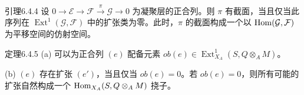\begin{origstatement}{引理}{6.4.4}\label{ch06:6.4.4}
设 $0\to\mathcal E\to\mathcal F\xrightarrow{\pi}\mathcal G\to0$ 为凝聚层的正合列。则 $\pi$ 有截面，当且仅当此序列在 $\operatorname{Ext}^1(\mathcal G,\mathcal F)$ 中的扩张类为零。此时，$\pi$ 的截面构成一个以 $\operatorname{Hom}(\mathcal G,\mathcal F)$ 为平移空间的仿射空间。
\end{origstatement}
\begin{origstatement}{定理}{6.4.5}\label{ch06:6.4.5}
(a) 可以为正合列 $(e)$ 配备元素 $ob(e)\in\operatorname{Ext}^1_{X_A}(S,Q\otimes_A M)$。

(b) $(e)$ 存在扩张 $(e')$，当且仅当 $ob(e)=0$。若 $ob(e)=0$，则所有可能的扩张自然构成一个 $\operatorname{Hom}_{X_A}(S,Q\otimes_A M)$ 挠子。
\end{origstatement}
